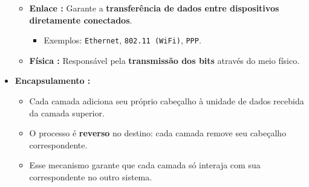 \begin{itemize}[left=0.5cm, align=left, nosep]
\begin{itemize}[left=0.5cm, nosep, label=$\hookrightarrow$]
                \item \textbf{Enlace :} Garante a \textbf{transferência de dados entre dispositivos diretamente conectados}.
                \begin{itemize}[left=0.5cm, nosep, label=$-$]
                    \item Exemplos: \texttt{Ethernet}, \texttt{802.11 (WiFi)}, \texttt{PPP}.
                \end{itemize}
            
                \item \textbf{Física :} Responsável pela \textbf{transmissão dos bits} através do meio físico. 
            
            \end{itemize} 

            \begin{center}
            \end{center}

        \item \textbf{Encapsulamento :} 
            \begin{itemize}[left=0.5cm, nosep, label=$\hookrightarrow$]
                \item Cada camada adiciona seu próprio cabeçalho à unidade de dados recebida da camada superior.
                \item O processo é \textbf{reverso} no destino: cada camada remove seu cabeçalho correspondente. 
                \item Esse mecanismo garante que cada camada só interaja com sua correspondente no outro sistema. 
            \end{itemize} 
             

\end{itemize}

